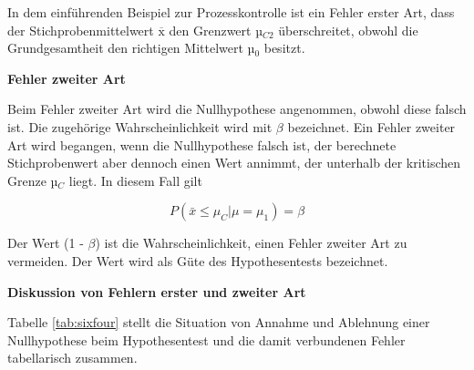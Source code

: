 \noindent In dem einf\"{u}hrenden Beispiel zur Prozesskontrolle ist ein Fehler erster Art, dass der Stichprobenmittelwert $\overline{\mathrm{x}}$ den Grenzwert µ$_{C2}$ \"{u}berschreitet, obwohl die Grundgesamtheit den richtigen Mittelwert µ$_{0}$ besitzt.\bigskip

{\selectfont
\noindent\textbf{Fehler zweiter Art}}\smallskip

\noindent Beim Fehler zweiter Art wird die Nullhypothese angenommen, obwohl diese falsch ist. Die zugeh\"{o}rige Wahrscheinlichkeit wird mit $\beta$ bezeichnet. Ein Fehler zweiter Art wird begangen, wenn die Nullhypothese falsch ist, der berechnete Stichprobenwert aber dennoch einen Wert annimmt, der unterhalb der kritischen Grenze µ$_{C}$ liegt. In diesem Fall gilt

\begin{equation}\label{eq:sixfiftyeight}
P\left(\bar{x}\le \mu _{C} |\mu =\mu _{1} \right)=\beta
\end{equation}

\noindent Der Wert (1 - $\beta$) ist die Wahrscheinlichkeit, einen Fehler zweiter Art zu vermeiden. Der Wert wird als G\"{u}te des Hypothesentests bezeichnet. \bigskip

{\selectfont
\noindent\textbf{Diskussion von Fehlern erster und zweiter Art}}\smallskip

\noindent Tabelle \ref{tab:sixfour} stellt die Situation von Annahme und Ablehnung einer Nullhypothese beim Hypothesentest und die damit verbundenen Fehler tabellarisch zusammen.

